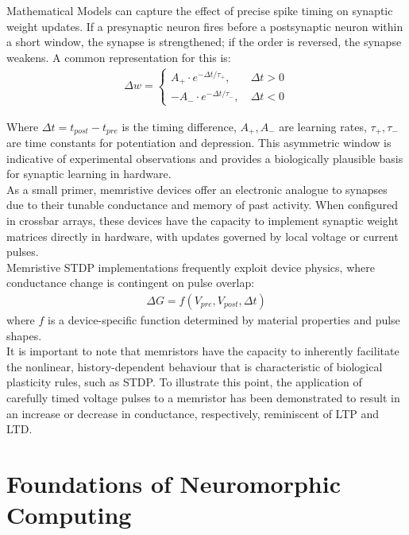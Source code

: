 \noindent Mathematical Models can capture the effect of precise spike timing on synaptic weight updates. If a presynaptic neuron fires before a postsynaptic neuron within a short window, the synapse is strengthened; if the order is reversed, the synapse weakens. A common representation for this is:
\begin{align}
\Delta w = \left\{ \begin{array}{cl}
    A_+ \cdot e^{-\Delta t/\tau_+}, & \ \Delta t > 0 \\
    -A_- \cdot e^{-\Delta t/\tau_-}, & \ \Delta t < 0
    \end{array} \right. \label{eq:2.20}
\end{align}

\noindent Where $\Delta t = t_{post} - t_{pre}$ is the timing difference, $A_+, A_-$ are learning rates, $\tau_+, \tau_-$ are time constants for potentiation and depression. This asymmetric window is indicative of experimental observations and provides a biologically plausible basis for synaptic learning in hardware.\\

\noindent As a small primer, memristive devices offer an electronic analogue to synapses due to their tunable conductance and memory of past activity. When configured in crossbar arrays, these devices have the capacity to implement synaptic weight matrices directly in hardware, with updates governed by local voltage or current pulses.\\

\noindent Memristive STDP implementations frequently exploit device physics, where conductance change is contingent on pulse overlap:
\begin{align}
    \Delta G = f(V_{pre}, V_{post}, \Delta t) \label{eq:2.21}
\end{align}
\noindent where $f$ is a device-specific function determined by material properties and pulse shapes. \\

\noindent It is important to note that memristors have the capacity to inherently facilitate the nonlinear, history-dependent behaviour that is characteristic of biological plasticity rules, such as STDP. To illustrate this point, the application of carefully timed voltage pulses to a memristor has been demonstrated to result in an increase or decrease in conductance, respectively, reminiscent of LTP and LTD.

\section[Foundations of Neuromorphic Computing]{Foundations of Neuromorphic Computing}


